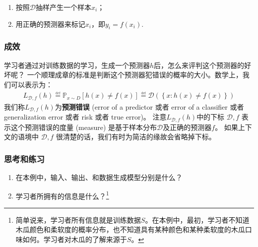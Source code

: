 \begin{enumerate}

\item
  按照\(\mathcal{D}\)抽样产生一个样本\(x_i\)；
\item
  用正确的预测器来标记\(x_i\)，即\(y_i=f(x_i)\).
\end{enumerate}

\subsubsection{成效}

学习者通过对训练数据的学习，生成一个预测器\(h\)后，怎么来评判这个预测器的好坏呢？
一个顺理成章的标准是判断这个预测器犯错误的概率的大小。数学上，我们可以表示为：
\[
\begin{aligned}
L_{\mathcal{D},f}(h) \overset{\underset{\mathrm{def}}{}}{=} \mathbb P_{x \sim D}\left[h(x) \neq f(x)\right] \overset{\underset{\mathrm{def}}{}}{=} \mathcal{D}\left(\left\{x:h(x) \neq f(x)\right\}\right)
\end{aligned}
\] 我们称\(L_{\mathcal{D},f}(h)\)为\textbf{预测错误} (error of a
predictor 或者 error of a classifier 或者 generalization error 或者 risk
或者 true error)。 注意\(L_{\mathcal{D},f}(h)\)中的下标
\(\mathcal{D},f\) 表示这个预测错误的度量 (measure)
是基于样本分布\(\mathcal{D}\)及正确的预测器\(f\)。 如果上下文的语境中
\(\mathcal{D},f\) 很清楚的话，我们有时为简洁的缘故会省略掉下标。

\subsubsection{思考和练习}

\begin{enumerate}

\item
  在本例中，输入、输出、和数据生成模型分别是什么？
\item
  学习者所拥有的信息是什么？\footnote{简单说来，学习者所有信息就是训练数据\(S\)。在本例中，最初，学习者不知道木瓜颜色和柔软度的概率分布，也不知道具有某种颜色和某种柔软度的木瓜口味如何。学习者对木瓜的了解来源于\(S\)。}
\end{enumerate}
